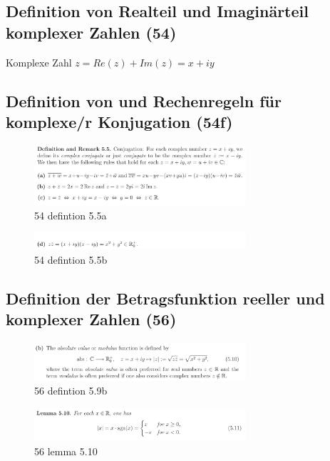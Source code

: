 \subsection{Definition von Realteil und Imaginärteil komplexer Zahlen (54)}
Komplexe Zahl $z = Re(z) + Im(z) = x + iy$

\subsection{Definition von und Rechenregeln für komplexe/r Konjugation (54f)}

\begin{figure}[H]
	\centering
  \includegraphics[width=0.7\textwidth]{media/54-defintion-5-5a.png}
	\caption{54 defintion 5.5a}
	\label{54_defintion_5.5a}
\end{figure}

\begin{figure}[H]
	\centering
  \includegraphics[width=0.7\textwidth]{media/54-defintion-5-5b.png}
	\caption{54 defintion 5.5b}
	\label{54_defintion_5.5b}
\end{figure}

\subsection{Definition der Betragsfunktion reeller und komplexer Zahlen (56)}

\begin{figure}[H]
	\centering
  \includegraphics[width=0.7\textwidth]{media/56-defintion-5-9b.png}
	\caption{56 defintion 5.9b}
	\label{56_defintion_5.9b}
\end{figure}

\begin{figure}[H]
	\centering
  \includegraphics[width=0.7\textwidth]{media/56-lemma-5-10.png}
	\caption{56 lemma 5.10}
	\label{56_lemma_5.10}
\end{figure}

